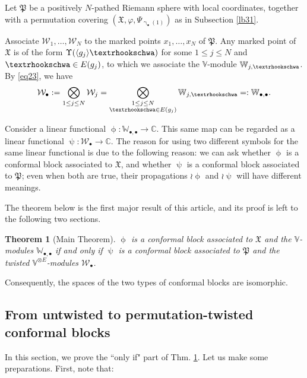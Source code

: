 \documentclass[11pt,b5paper,notitlepage]{article}
\theoremstyle{definition}
\theoremstyle{plain}
\newtheorem{thm}[df]{Theorem}
\newcommand{\fk}{\mathfrak}
\newcommand{\mc}{\mathcal}
\newcommand{\bk}[1]{\langle {#1}\rangle}
\newcommand{\blt}{\bullet}
\newcommand{\Vbb}{\mathbb V}
\newcommand{\Wbb}{\mathbb W}
\newcommand{\Cbb}{\mathbb C}
\newcommand{\tipae}{\text{\textrhookschwa}}
\numberwithin{equation}{subsection}
\begin{document}
Let $\fk P$ be a positively $N$-pathed Riemann sphere with local coordinates, together with a permutation covering $(\fk X,\varphi,\Psi_{\upgamma_\blt(1)})$ as in Subsection \ref{lb31}.

Associate $\mc W_1,\dots,\mc W_N$ to the marked points $x_1,\dots,x_N$ of $\fk P$. Any marked point of $\fk X$ is of the form $\Upsilon(\bk{g_j}\tipae)$ for some $1\leq j\leq N$ and $\tipae\in E(g_j)$, to which we associate the $\Vbb$-module $\Wbb_{j,\tipae}$. By \eqref{eq23}, we have
\begin{align*}
	\mc W_\blt:=\bigotimes_{1\leq j\leq N}\mc W_j=\bigotimes_{\begin{subarray}{c}
			1\leq j\leq N\\	
			\tipae\in E(g_j)
	\end{subarray}}\Wbb_{j,\tipae}=:\Wbb_{\blt,\blt}.
\end{align*}

Consider a linear functional $\upphi:\Wbb_{\blt,\blt}\rightarrow\Cbb$. This same map can be regarded as a linear functional $\uppsi:\mc W_\blt\rightarrow\Cbb$. The reason for using two different symbols for the same linear functional is due to the following reason: we can ask whether $\upphi$ is a conformal block associated to $\fk X$, and whether $\uppsi$ is a conformal block associated to $\fk P$; even when both are true, their propagations $\wr\upphi$ and $\wr\uppsi$ will have different meanings.


The theorem below is the first major result of this article, and its proof is left to the following two sections.

\begin{thm}[Main Theorem]\label{lb14}
$\upphi$ is a conformal block associated to $\fk X$ and the $\Vbb$-modules $\Wbb_{\blt,\blt}$ if and only if $\uppsi$ is a conformal block associated to $\fk P$ and the twisted $\Vbb^{\otimes 
E}$-modules $\mc W_\blt$.
\end{thm}


Consequently, the spaces of the two types of conformal blocks are isomorphic.



\subsection{From untwisted to permutation-twisted conformal blocks}\label{lb1}






In this section, we prove the ``only if" part of Thm. \ref{lb14}. Let us  make some preparations. First, note that:
\end{document}
